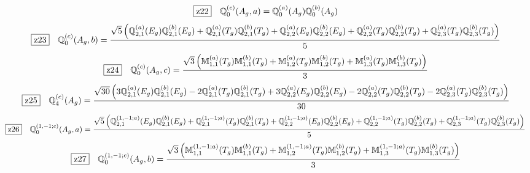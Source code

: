 \documentclass[fleqn,10pt,landscape]{jsarticle}
\begin{document}
\begin{dmath*}
\hspace*{3mm}\fbox{z22}\quad \mathbb{Q}_{0}^{(c)}(A_{g},a)=\mathbb{Q}_{0}^{(a)}(A_{g}) \mathbb{Q}_{0}^{(b)}(A_{g})
\end{dmath*}
\begin{dmath*}
\hspace*{3mm}\fbox{z23}\quad \mathbb{Q}_{0}^{(c)}(A_{g},b)=\frac{\sqrt{5} \left(\mathbb{Q}_{2,1}^{(a)}(E_{g}) \mathbb{Q}_{2,1}^{(b)}(E_{g}) + \mathbb{Q}_{2,1}^{(a)}(T_{g}) \mathbb{Q}_{2,1}^{(b)}(T_{g}) + \mathbb{Q}_{2,2}^{(a)}(E_{g}) \mathbb{Q}_{2,2}^{(b)}(E_{g}) + \mathbb{Q}_{2,2}^{(a)}(T_{g}) \mathbb{Q}_{2,2}^{(b)}(T_{g}) + \mathbb{Q}_{2,3}^{(a)}(T_{g}) \mathbb{Q}_{2,3}^{(b)}(T_{g})\right)}{5}
\end{dmath*}
\begin{dmath*}
\hspace*{3mm}\fbox{z24}\quad \mathbb{Q}_{0}^{(c)}(A_{g},c)=\frac{\sqrt{3} \left(\mathbb{M}_{1,1}^{(a)}(T_{g}) \mathbb{M}_{1,1}^{(b)}(T_{g}) + \mathbb{M}_{1,2}^{(a)}(T_{g}) \mathbb{M}_{1,2}^{(b)}(T_{g}) + \mathbb{M}_{1,3}^{(a)}(T_{g}) \mathbb{M}_{1,3}^{(b)}(T_{g})\right)}{3}
\end{dmath*}
\begin{dmath*}
\hspace*{3mm}\fbox{z25}\quad \mathbb{Q}_{4}^{(c)}(A_{g})=\frac{\sqrt{30} \left(3 \mathbb{Q}_{2,1}^{(a)}(E_{g}) \mathbb{Q}_{2,1}^{(b)}(E_{g}) - 2 \mathbb{Q}_{2,1}^{(a)}(T_{g}) \mathbb{Q}_{2,1}^{(b)}(T_{g}) + 3 \mathbb{Q}_{2,2}^{(a)}(E_{g}) \mathbb{Q}_{2,2}^{(b)}(E_{g}) - 2 \mathbb{Q}_{2,2}^{(a)}(T_{g}) \mathbb{Q}_{2,2}^{(b)}(T_{g}) - 2 \mathbb{Q}_{2,3}^{(a)}(T_{g}) \mathbb{Q}_{2,3}^{(b)}(T_{g})\right)}{30}
\end{dmath*}
\begin{dmath*}
\hspace*{3mm}\fbox{z26}\quad \mathbb{Q}_{0}^{(1,-1;c)}(A_{g},a)=\frac{\sqrt{5} \left(\mathbb{Q}_{2,1}^{(1,-1;a)}(E_{g}) \mathbb{Q}_{2,1}^{(b)}(E_{g}) + \mathbb{Q}_{2,1}^{(1,-1;a)}(T_{g}) \mathbb{Q}_{2,1}^{(b)}(T_{g}) + \mathbb{Q}_{2,2}^{(1,-1;a)}(E_{g}) \mathbb{Q}_{2,2}^{(b)}(E_{g}) + \mathbb{Q}_{2,2}^{(1,-1;a)}(T_{g}) \mathbb{Q}_{2,2}^{(b)}(T_{g}) + \mathbb{Q}_{2,3}^{(1,-1;a)}(T_{g}) \mathbb{Q}_{2,3}^{(b)}(T_{g})\right)}{5}
\end{dmath*}
\begin{dmath*}
\hspace*{3mm}\fbox{z27}\quad \mathbb{Q}_{0}^{(1,-1;c)}(A_{g},b)=\frac{\sqrt{3} \left(\mathbb{M}_{1,1}^{(1,-1;a)}(T_{g}) \mathbb{M}_{1,1}^{(b)}(T_{g}) + \mathbb{M}_{1,2}^{(1,-1;a)}(T_{g}) \mathbb{M}_{1,2}^{(b)}(T_{g}) + \mathbb{M}_{1,3}^{(1,-1;a)}(T_{g}) \mathbb{M}_{1,3}^{(b)}(T_{g})\right)}{3}
\end{dmath*}
\end{document}
